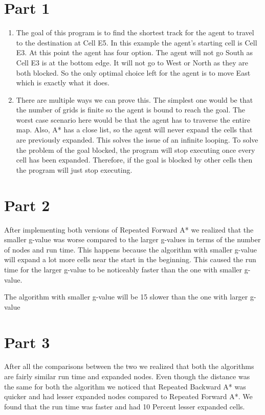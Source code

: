 \documentclass[a4paper, 12pt, one column]{article}
\begin{document}
\section*{Part 1}
  \begin{enumerate}[label=\alph*]
    \item 
      \begin{flushleft}
        The goal of this program is to find the shortest track for the agent to travel to the destination at Cell E5. In this example the agent's starting cell is Cell E3. At this point the agent has four option. The agent will not go South as Cell E3 is at the bottom edge. It will not go to West or North as they are both blocked. So the only optimal choice left for the agent is to move East which is exactly what it does. 
        \end{flushleft}
    \item 
    \begin{flushleft}
   There are multiple ways we can prove this. The simplest one would be that the number of grids is finite so the agent is bound to reach the goal. The worst case scenario here would be that the agent has to traverse the entire map. Also, A* has a close list, so the agent will never expand the cells that are previously expanded. This solves the issue of an infinite looping. To solve the problem of the goal blocked, the program will stop executing once every cell has been expanded. Therefore, if the goal is blocked by other cells then the program will just stop executing. 
    \end{flushleft}
  \end{enumerate}
  

  
\section*{Part 2}
        After implementing both versions of Repeated Forward A* we realized that the smaller g-value was worse compared to the larger g-values in terms of the number of nodes and run time.
        This happens because the algorithm with smaller g-value will expand a lot more cells near the start in the beginning. This caused the run time for the larger g-value to be noticeably faster than the one with smaller g-value.
   
        \par The algorithm with smaller g-value will be 15 slower than the one with larger g-value

\section*{Part 3}
        After all the comparisons between the two we realized that both the algorithms are fairly similar run time and expanded nodes. Even though the distance was the same for both the algorithm we noticed that Repeated Backward A* was quicker and had lesser expanded nodes compared to Repeated Forward A*. We found that the run time was faster and had 10 Percent lesser expanded cells. 
  
\end{document}
